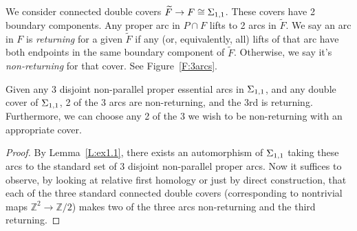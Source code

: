 We consider connected double covers $\widetilde{F} \to F \cong \Sigma_{1,1}$.
These covers have 2 boundary components. Any proper arc in $P \cap F$ lifts to
2 arcs in $\widetilde{F}$.  We say an arc in $F$ is \emph{returning} for
  a given $\widetilde{F}$ if any (or, equivalently, all) lifts of that arc have
  both endpoints in the same boundary component of $\widetilde{F}$.  Otherwise,
  we say it's \emph{non-returning} for that cover. See Figure~\ref{F:3arcs}.


\begin{lemma}\label{L:ex1.2}

Given any 3 disjoint non-parallel proper essential arcs in $\Sigma_{1,1}$, and any
double cover of $\Sigma_{1,1}$, 2 of the 3 arcs are non-returning, and the 3rd is
returning.  Furthermore, we can choose any 2 of the 3 we wish to be
non-returning with an appropriate cover.

\end{lemma}
\begin{proof}

By Lemma~\ref{L:ex1.1}, there exists an automorphism of $\Sigma_{1,1}$ taking
these arcs to the standard set of 3 disjoint non-parallel proper arcs. Now it
suffices to observe, by looking at relative first homology or just by direct
construction, that each of the three standard connected double covers
(corresponding to nontrivial maps $\mathbb{Z}^2 \to \mathbb{Z}/2$) makes two of
the three arcs non-returning and the third returning.

\end{proof}

